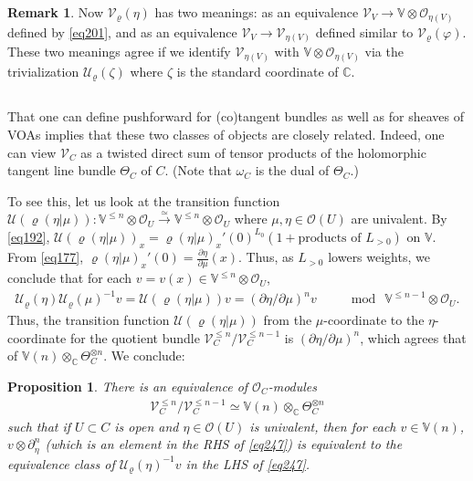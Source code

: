 \documentclass[12pt,a4paper,notitlepage]{article}
\theoremstyle{definition}
\newtheorem{rem}[df]{Remark}
\theoremstyle{plain}
\newtheorem{pp}[df]{Proposition}
\newcommand{\mc}{\mathcal}
\newcommand{\scr}{\mathscr}
\newcommand{\Vbb}{\mathbb V}
\newcommand{\Cbb}{\mathbb C}
\numberwithin{equation}{section}
\begin{document}
\begin{rem}
Now $\mc V_\varrho(\eta)$ has two meanings: as an equivalence $\scr V_V\rightarrow\Vbb\otimes\scr O_{\eta(V)}$ defined by \eqref{eq201}, and as an equivalence $\scr V_V\rightarrow\scr V_{\eta(V)}$ defined similar to $\mc V_\varrho(\varphi)$. These two meanings agree if we identify  $\scr V_{\eta(V)}$ with $\Vbb\otimes\scr O_{\eta(V)}$ via the trivialization $\mc U_\varrho(\zeta)$ where $\zeta$ is the standard coordinate of $\Cbb$.
\end{rem}



\subsection{}\label{lb150}

That one can define pushforward for (co)tangent bundles as well as for sheaves of VOAs implies that these two classes of objects are closely related. Indeed, one can view $\scr V_C$ as a twisted direct sum of tensor products of the holomorphic tangent line bundle $\Theta_C$ of $C$.  (Note that $\omega_C$ is the dual of $\Theta_C$.)

To see this, let us look at the transition function $\mc U(\varrho(\eta|\mu)):\Vbb^{\leq n}\otimes\scr O_U\xrightarrow{\simeq}\Vbb^{\leq n}\otimes\scr O_U$ where $\mu,\eta\in\scr O(U)$ are univalent. By \eqref{eq192}, $\mc U(\varrho(\eta|\mu))_x=\varrho(\eta|\mu)_x'(0)^{L_0}(1+\text{products of }L_{>0})$ on $\Vbb$. From \eqref{eq177}, $\varrho(\eta|\mu)_x'(0)=\frac{\partial\eta}{\partial\mu}(x)$. Thus, as $L_{>0}$ lowers weights, we conclude that for each $v=v(x)\in\Vbb^{\leq n}\otimes\scr O_U$,
\begin{align}
\mc U_\varrho(\eta)\mc U_\varrho(\mu)^{-1}v=\mc U(\varrho(\eta|\mu))v=(\partial\eta/\partial\mu)^nv\qquad\mod~\Vbb^{\leq n-1}\otimes\scr O_U.
\end{align}
Thus, the transition function $\mc U(\varrho(\eta|\mu))$ from the $\mu$-coordinate to the $\eta$-coordinate for the quotient bundle $\scr V^{\leq n}_C/\scr V^{\leq n-1}_C$ is $(\partial\eta/\partial\mu)^n$, which agrees that of $\Vbb(n)\otimes_\Cbb\Theta_C^{\otimes n}$. We conclude:
\begin{pp}\label{lb178}
There is an equivalence of $\scr O_C$-modules
\begin{align}
\scr V^{\leq n}_C/\scr V^{\leq n-1}_C\simeq \Vbb(n)\otimes_\Cbb\Theta_C^{\otimes n}\label{eq247}
\end{align}
such that if $U\subset C$ is open and $\eta\in\scr O(U)$ is univalent, then for each $v\in\Vbb(n)$, $v\otimes \partial_\eta^n$ (which is an element in the RHS of \eqref{eq247}) is equivalent to the equivalence class of $\mc U_\varrho(\eta)^{-1}v$ in the LHS of \eqref{eq247}.
\end{pp}
\end{document}

